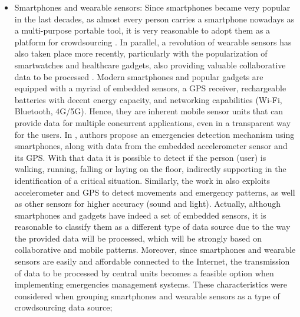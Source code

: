 \begin{refsection}
\begin{itemize}
  \item Smartphones and wearable sensors: Since smartphones became very popular in the last decades, as almost every person carries a smartphone nowadays as a multi-purpose portable tool, it is very reasonable to adopt them as a platform for crowdsourcing \cite{crowdsourcing1}. In parallel, a revolution of wearable sensors has also taken place more recently, particularly with the popularization of smartwatches and healthcare gadgets, also providing valuable collaborative data to be processed \cite{wearable1,wearable2,iotgadget1}. Modern smartphones and popular gadgets are equipped with a myriad of embedded sensors, a GPS receiver, rechargeable batteries with decent energy capacity, and networking capabilities (Wi-Fi, Bluetooth, 4G/5G). Hence, they are inherent mobile sensor units that can provide data for multiple concurrent applications, even in a transparent way for the users. In \cite{crowdsourcing4}, authors propose an emergencies detection mechanism using smartphones, along with data from the embedded accelerometer sensor and its GPS. With that data it is possible to detect if the person (user) is walking, running, falling or laying on the floor, indirectly supporting in the identification of a critical situation. Similarly, the work in \cite{crowdsourcing4} also exploits accelerometer and GPS to detect movements and emergency patterns, as well as other sensors for higher accuracy (sound and light). Actually, although smartphones and gadgets have indeed a set of embedded sensors, it is reasonable to classify them as a different type of data source due to the way the provided data will be processed, which will be strongly based on collaborative and mobile patterns. Moreover, since smartphones and wearable sensors are easily and affordable connected to the Internet, the transmission of data to be processed by central units becomes a feasible option when implementing emergencies management systems. These characteristics were considered when grouping smartphones and wearable sensors as a type of crowdsourcing data source;
  

\end{itemize}
\end{refsection}
